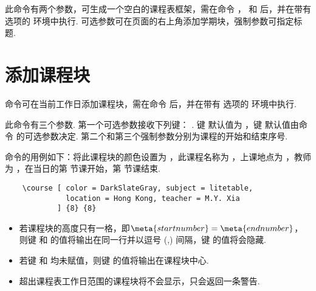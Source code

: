 \documentclass[letterpaper]{l3doc}
\begin{document}
\begin{function}{\maketable}
  \begin{syntax}
                
  \end{syntax}

  此命令有两个参数，可生成一个空白的课程表框架，需在命令 ， 和  后，并在带有  选项的  环境中执行. 可选参数可在页面的右上角添加学期块，强制参数可指定标题.
\end{function}

\section{添加课程块}

\begin{function}{\course}
  \begin{syntax}
  \end{syntax}

   命令可在当前工作日添加课程块，需在命令  后，并在带有  选项的  环境中执行.
  
  此命令有三个参数. 第一个可选参数接收下列键：    . 键  默认值为 ，键  默认值由命令  的可选参数决定. 第二个和第三个强制参数分别为课程的开始和结束序号.

   命令的用例如下：将此课程块的颜色设置为 ，此课程名称为 ，上课地点为 ，教师为 ，在当日的第  节课开始，第  节课结束.
  
  \begin{framed}
    \begin{verbatim}
    \course [ color = DarkSlateGray, subject = litetable,
              location = Hong Kong, teacher = M.Y. Xia
            ] {8} {8}
    \end{verbatim}
  \end{framed}
  
  \begin{itemize}[topsep = 0pt]
    \item 若课程块的高度只有一格，即$\meta{start number} = \meta{end number}$，则键  和  的值将输出在同一行并以逗号 (,) 间隔，键  的值将会隐藏.
    \item 若键  和  均未赋值，则键  的值将输出在课程块中心.
    \item 超出课程表工作日范围的课程块将不会显示，只会返回一条警告.
  \end{itemize}
\end{function}
\end{document}
